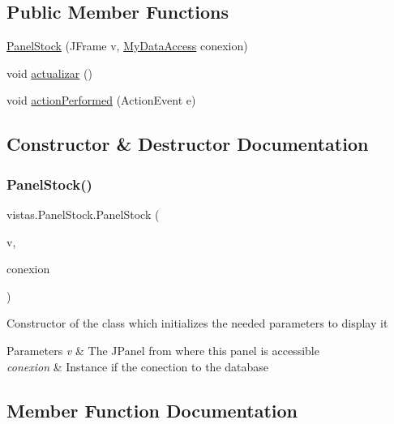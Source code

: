 \subsection*{Public Member Functions}
\begin{DoxyCompactItemize}
\item 
\mbox{\hyperlink{classvistas_1_1_panel_stock_ac2656229352b5e5f052656946d81bf0d}{Panel\+Stock}} (J\+Frame v, \mbox{\hyperlink{classconexion_s_q_l_1_1_my_data_access}{My\+Data\+Access}} conexion)
\item 
void \mbox{\hyperlink{classvistas_1_1_panel_stock_a10b718e705ff2bf3264a018f07a2eab6}{actualizar}} ()
\item 
void \mbox{\hyperlink{classvistas_1_1_panel_stock_a43487e4ae1276f0a5a855790bcd5c900}{action\+Performed}} (Action\+Event e)
\end{DoxyCompactItemize}


\subsection{Constructor \& Destructor Documentation}
\mbox{\label{classvistas_1_1_panel_stock_ac2656229352b5e5f052656946d81bf0d}} 
\subsubsection{\texorpdfstring{Panel\+Stock()}{PanelStock()}}
{\footnotesize\ttfamily vistas.\+Panel\+Stock.\+Panel\+Stock (\begin{DoxyParamCaption}\item[{J\+Frame}]{v,  }\item[{\mbox{\hyperlink{classconexion_s_q_l_1_1_my_data_access}{My\+Data\+Access}}}]{conexion }\end{DoxyParamCaption})}

Constructor of the class which initializes the needed parameters to display it 
\begin{DoxyParams}{Parameters}
{\em v} & The J\+Panel from where this panel is accessible \\
\hline
{\em conexion} & Instance if the conection to the database \\
\hline
\end{DoxyParams}


\subsection{Member Function Documentation}
\mbox{\label{classvistas_1_1_panel_stock_a43487e4ae1276f0a5a855790bcd5c900}} 
